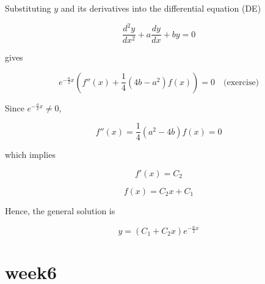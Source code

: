 \documentclass{article}
\begin{document}
\begin{enumerate}
\begin{itemize}
\begin{itemize}
                  Substituting \( y \) and its derivatives into the differential equation (DE)

                  \[
                  \frac{d^2y}{dx^2} + a\frac{dy}{dx} + by = 0
                  \]

                  gives

                  \[
                  e^{-\frac{a}{2}x} \left( f''(x) + \frac{1}{4}(4b - a^2)f(x) \right) = 0 \quad \text{(exercise)}
                  \]

                  Since \( e^{-\frac{a}{2}x} \neq 0 \),

                  \[
                  f''(x) = \frac{1}{4}(a^2 - 4b)f(x) = 0
                  \]

                  which implies

                  \[
                  f'(x) = C_2
                  \]

                  \[
                  f(x) = C_2 x + C_1
                  \]

                  Hence, the general solution is

                  \[
                  y = (C_1 + C_2 x) e^{-\frac{a}{2}x}
                  \]


            \end{itemize}
        \end{itemize}

      \end{enumerate}

  \newpage

  \section{week6}
\end{document}
